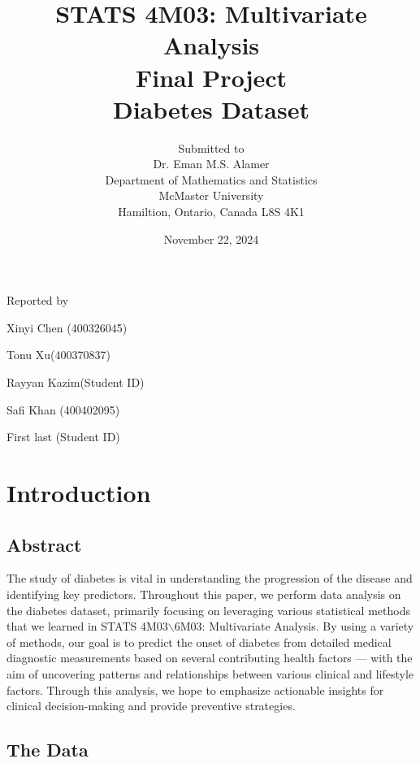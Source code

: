 \documentclass[12pt]{article}
\begin{document}
\title{STATS 4M03: Multivariate Analysis\\ Final Project \\ Diabetes Dataset }

\author{Submitted to\\ Dr. Eman M.S. Alamer 
\\Department of Mathematics and Statistics
\\McMaster University\\Hamiltion, Ontario, Canada L8S 4K1}
\date {November 22, 2024}


\maketitle

 \centerline{Reported by}
 \centerline{Xinyi Chen (400326045)}
  \centerline{Tonu Xu(400370837)}
   \centerline{Rayyan Kazim(Student ID)}
    \centerline{Safi Khan (400402095)}
     \centerline{First last (Student ID)}


\newpage
\section{Introduction}
\subsection{Abstract}



\begin{indent} 
\onehalfspacing	
	
The study of diabetes is vital in understanding the progression of the disease and identifying key predictors. Throughout this paper, we perform data analysis on the diabetes dataset, primarily focusing on leveraging various statistical methods that we learned in STATS 4M03$\backslash$6M03: Multivariate Analysis. By using a variety of methods, our goal is to predict the onset of diabetes from detailed medical diagnostic measurements based on several contributing health factors --- with the aim of uncovering patterns and relationships between various clinical and lifestyle factors. Through this analysis, we hope to emphasize actionable insights for clinical decision-making and provide preventive strategies. 
\end{indent}

\subsection{The Data}
\end{document}
